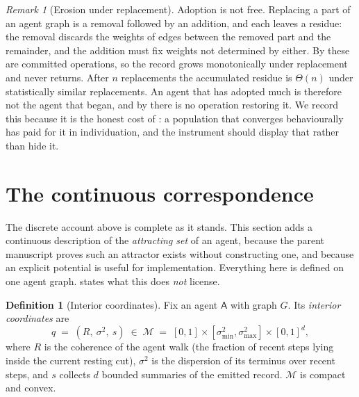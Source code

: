 \documentclass[11pt,a4paper]{article}
\theoremstyle{clstyle}
\theoremstyle{definition}
\newtheorem{definition}[theorem]{Definition}
\theoremstyle{remark}
\newtheorem{remark}[theorem]{Remark}
\newcommand{\Ag}{\mathsf{A}}
\newcommand{\Ord}{R}
\begin{document}
\begin{remark}[Erosion under replacement]
\label{rem:erosion}
Adoption is not free. Replacing a part of an agent graph is a removal
followed by an addition, and each leaves a residue: the removal discards the
weights of edges between the removed part and the remainder, and the
addition must fix weights not determined by either. By 
these are committed operations, so the record grows monotonically under
replacement and never returns. After $n$ replacements the accumulated
residue is $\Theta(n)$ under statistically similar replacements. An agent
that has adopted much is therefore not the agent that began, and by
 there is no operation restoring it. We record this
because it is the honest cost of : a population that
converges behaviourally has paid for it in individuation, and the instrument
should display that rather than hide it.
\end{remark}

\section{The continuous correspondence}
\label{sec:continuous}

The discrete account above is complete as it stands. This section adds a
continuous description of the \emph{attracting set} of an agent, because the
parent manuscript proves such an attractor exists without constructing one,
and because an explicit potential is useful for implementation. Everything
here is defined on one agent graph.  states what
this does \emph{not} license.

\begin{definition}[Interior coordinates]
\label{def:coords}
Fix an agent $\Ag$ with graph $G$. Its \emph{interior coordinates} are
\begin{equation}
q \;=\; (\Ord,\ \sigma^2,\ s) \;\in\; \mathcal{M} \;=\; [0,1]\times[\sigma^2_{\min},\sigma^2_{\max}]\times[0,1]^{d},
\end{equation}
where $\Ord$ is the coherence of the agent walk (the fraction of recent
steps lying inside the current resting cut), $\sigma^2$ is the dispersion of
its terminus over recent steps, and $s$ collects $d$ bounded summaries of
the emitted record. $\mathcal{M}$ is compact and convex.
\end{definition}
\end{document}
